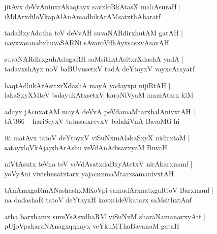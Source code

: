 \documentclass[twoside,12pt,openright]{book}
\newcounter{shloka}[chapter]
\begin{document}
\begin{shloka}%
jitAvx deVvAninxrAkaqtayx savxloRkAtasX mahAsuraH |\\
iMdArxdiloVkapAlAnAmadhikArAMsatxthAharatf
\end{shloka}

\begin{shloka}%
tadaBxyAdatha teV deVvAH suvaNARdirxhutAM gatAH |\\
nayxvasanabxhuvaSARNi sAvaroVdhAyxsasxvAsavAH 
\end{shloka}

\begin{shloka}%
suvaNARdirxguhAdugaRH saMsithxtAsitxrXdashA yadA |\\
tadavxshAyx noV baBUvusetxV tadA deYtoyxV vayxcArayatf
\end{shloka}

\begin{shloka}%
haqtAdhikArAsitxrXdashA mayA yadayxpi nijiRtAH |\\
lakaSxyXMteV balayukAtxsetxV karaNiVyaM mamAtarx kiM 
\end{shloka}

\begin{shloka}%
adayx jAcnxatAM mayA deVvA peVdamaMtarxbalAnivxtAH |\\
tA\char'366 ~ hariSeyxV tatasasxrevxV balahiVnA BavaMti hi
\end{shloka}

\begin{shloka}%
iti matAvx tatoV deYtoyxV viSuNxmAlakaSxyX nidirxtaM |\\
satayxloVkAjajxhArAshu veVdAnAdisavxyaM BuvaH 
\end{shloka}

\begin{shloka}%
niVtAsutx teVna teV veVdAsatxdaBxyAtetxV nirAkarxmanf |\\
yoVyAni vivishusatxtarx yajacnxmaMtarxsamanivxtAH 
\end{shloka}

\begin{shloka}%
tAnAmxgaRmANashashxMKoVpi samudArxnatxgaRtoV Barxmanf |\\
na dadashaR tatoV deYtayxH kavxcideVkatarx saMsithxtAnf
\end{shloka}

\begin{shloka}%
atha barxhamx sureYsAsxdhaRM viSuNxM sharaNamanavxyAtf |\\
pUjoVpakaraNAnagxqqhayx veYkuMThaBavanaM gataH 
\end{shloka}
\end{document}
